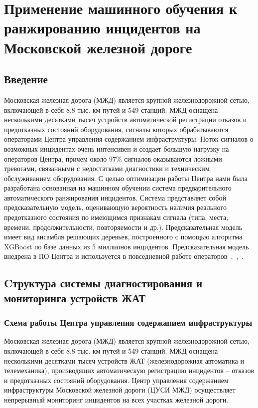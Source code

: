 \DeclareRobustCommand{\nomenclature}[2]{%
}

\DeclareRobustCommand{\cyrins}[1]{%
 #1
}

\chapter{Применение машинного обучения к ранжированию инцидентов на Московской железной дороге} \label{chapt2}

\section{Введение}
Московская железная дорога (МЖД) \nomenclature{МЖД}{Московская железная дорога} является крупной железнодорожной сетью, включающей в себя 8.8 тыс. км путей и 549 станций. МЖД оснащена несколькими десятками тысяч устройств автоматической регистрации отказов и предотказных состояний оборудования, сигналы которых обрабатываются операторами Центра управления содержанием инфраструктуры. Поток сигналов о возможных инцидентах очень интенсивен и создает большую нагрузку на операторов Центра, причем около 97\% сигналов оказываются ложными тревогами, связанными с недостатками диагностики и техническим обслуживанием оборудования. С целью оптимизации работы Центра нами была разработана основанная на машинном обучении система предварительного автоматического ранжирования инцидентов. Система представляет собой предсказательную модель, оценивающую вероятность наличия реального предотказного состояния по имеющимся признакам сигнала (типа, места, времени,  продолжительности, повторяемости и др.). Предсказательная модель имеет вид ансамбля решающих деревьев, построенного с помощью алгоритма XGBoost по базе данных из 5 миллионов инцидентов. Предсказательная модель внедрена в ПО Центра и используется в повседневной работе операторов~\cite{bulletin-rzd},~\cite{itivs-2017},~\cite{icmla-2017}.

\section{Cтруктура системы диагностирования и мониторинга устройств ЖАТ}
\subsection{Схема работы Центра управления содержанием инфраструктуры}
Московская железная дорога (МЖД) \nomenclature{МЖД}{Московская железная дорога} является крупной железнодорожной сетью, включающей в себя 8.8 тыс. км путей и 549 станций. МЖД оснащена несколькими десятками тысяч устройств ЖАТ (железнодорожная автоматика и телемеханика), производящих автоматическую регистрацию инцидентов -- отказов и предотказных состояний оборудования. Центр управления содержанием инфраструктуры \nomenclature{ЦУСИ}{Центр управления содержанием инфраструктуры} Московской железной дороги (ЦУСИ МЖД) осуществляет непрерывный мониторинг инцидентов на всех участках железной дороги. 
\nomenclature{ЖАТ}{Железнодорожная автоматика и телемеханика}

